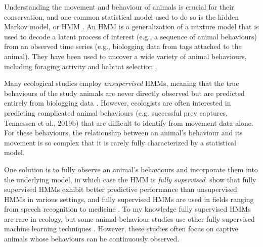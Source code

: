 

Understanding the movement and behaviour of animals is crucial for their conservation, and one common statistical model used to do so is the hidden Markov model, or HMM \citep{Sutherland:1998, Ogburn:2017, McClintock:2020}. An HMM is a generalization of a mixture model that is used to decode a latent process of interest (e.g., a sequence of animal behaviours) from an observed time series (e.g., biologging data from tags attached to the animal). They have been used to uncover a wide variety of animal behaviours, including foraging activity \citep{Lusseau:2009, Ylitalo:2023} and habitat selection \citep{Klappstein:2023}.

Many ecological studies employ \textit{unsupervised} HMMs, meaning that the true behaviours of the study animals are never directly observed but are predicted entirely from biologging data \citep{Barajas:2017, Patterson:2017, Pirotta:2018, Adam:2019}. However, ecologists are often interested in predicting complicated animal behaviours (e.g. successful prey captures, Tennessen et al., 2019b)\nocite{Tennessen:2019b} that are difficult to identify from movement data alone. For these behaviours, the relationship between an animal’s behaviour and its movement is so complex that it is rarely fully characterized by a statistical model.  

One solution is to fully observe an animal's behaviours and incorporate them into the underlying model, in which case the HMM is \textit{fully supervised}. \citet{Krogh:1997} show that fully supervised HMMs exhibit better predictive performance than unsupervised HMMs in various settings, and fully supervised HMMs are used in fields ranging from speech recognition to medicine \citep{Bagos:2003, Tamposis:2018}. To my knowledge fully supervised HMMs are rare in ecology, but some animal behaviour studies use other fully supervised machine learning techniques \citep{Carroll:2014, Allen:2016}. However, these studies often focus on captive animals whose behaviours can be continuously observed. 


